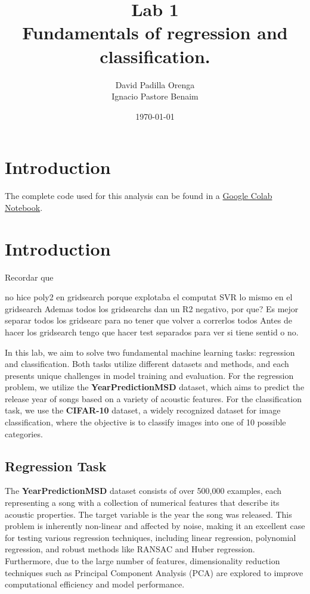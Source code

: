 \documentclass[twocolumn]{article}
\title{Lab 1 \\ \small Fundamentals of regression and classiﬁcation.}
\author{David Padilla Orenga\\ Ignacio Pastore Benaim}
\date{\today}   %
\begin{document}
\maketitle

\section{Introduction}


The complete code used for this analysis can be found in a \href{https://colab.research.google.com/drive/1Gg35b8epwsI3nkCeiqCgBeFCd3aNdahI?usp=sharing}{Google Colab Notebook}.

\section{Introduction}

Recordar que

no hice poly2 en gridsearch porque explotaba el computat
SVR lo mismo en el gridsearch
Ademas todos los gridsearchs dan un R2 negativo, por que?
Es mejor separar todos los gridsearc para no tener que volver a correrlos todos
Antes de hacer los gridsearch tengo que hacer test separados para ver si tiene sentid o no.







In this lab, we aim to solve two fundamental machine learning tasks: regression and classification. Both tasks utilize different datasets and methods, and each presents unique challenges in model training and evaluation. For the regression problem, we utilize the \textbf{YearPredictionMSD} dataset, which aims to predict the release year of songs based on a variety of acoustic features. For the classification task, we use the \textbf{CIFAR-10} dataset, a widely recognized dataset for image classification, where the objective is to classify images into one of 10 possible categories.

\subsection{Regression Task}

The \textbf{YearPredictionMSD} dataset consists of over 500,000 examples, each representing a song with a collection of numerical features that describe its acoustic properties. The target variable is the year the song was released. This problem is inherently non-linear and affected by noise, making it an excellent case for testing various regression techniques, including linear regression, polynomial regression, and robust methods like RANSAC and Huber regression. Furthermore, due to the large number of features, dimensionality reduction techniques such as Principal Component Analysis (PCA) are explored to improve computational efficiency and model performance.
\end{document}
